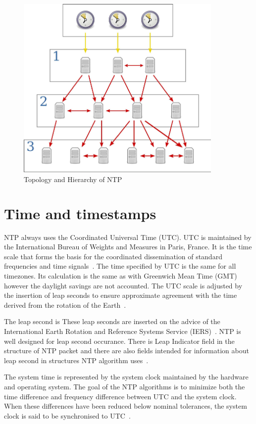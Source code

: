 \begin{figure}
  \centering
  \includegraphics[width=10cm,keepaspectratio]{fig/Network_Time_Protocol_servers_and_clients.pdf}
  \caption{Topology and Hierarchy of NTP}
  \label{fig:ntp-hierarchy}
\end{figure}


\section{Time and timestamps}\label{sec:ntp-time}
NTP always uses the Coordinated Universal Time (UTC).
UTC is maintained by the International Bureau of Weights and Measures in Paris, France.
It is the time scale that forms the basis for the coordinated dissemination of standard frequencies and time signals~\cite{bipm-utc}.
The time specified by UTC is the same for all timezones.
Its calculation is the same as with Greenwich Mean Time (GMT) however
the daylight savings are not accounted. %
The UTC scale is adjusted by the insertion of leap seconds to ensure approximate
agreement with the time derived from the rotation of the Earth~\cite{bipm-utc}.

The leap second is 
These leap seconds are inserted on the advice of the International Earth Rotation and Reference Systems Service (IERS)~\cite{bipm-utc}.
NTP is well designed for leap second occurance.
There is Leap Indicator field
in the structure of NTP packet and there are also fields intended for
information about leap second in structures NTP algorithm uses~\cite{rfc5905}.

The system time is represented by the system clock maintained by
the hardware and operating system.
The goal of the NTP algorithms is to minimize
both the time difference and frequency difference between UTC and the system clock.
When these differences have been reduced below nominal
tolerances, the system clock is said to be synchronised to UTC~\cite{rfc5905}.

